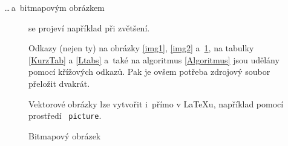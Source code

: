 \documentclass[a4paper,11pt, titlepage]{article}
\begin{document}
\noindent \ldots\,a~bitmapovým obrázkem
\begin{figure}[ht]
\begin{center}
    \caption{Bitmapový obrázek}
    \label{img3}
\end{center}
se projeví například při zvětšení.

\quad Odkazy (nejen ty) na obrázky \ref{img1}, \ref{img2} a~\ref{img3}, na tabulky \ref{KurzTab} a \ref{Ltabs} a~také na algoritmus \ref{Algoritmus} jsou udělány pomocí křížových odkazů. Pak je ovšem potřeba zdrojový soubor přeložit dvakrát.

\quad Vektorové obrázky lze vytvořit i~přímo v \LaTeX u, například pomocí prostředí \ \texttt{picture}.
\end{figure}

\newpage
\end{document}
